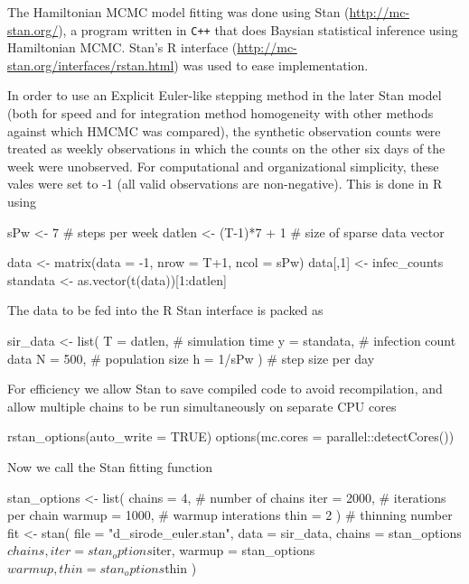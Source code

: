 \documentclass[12pt]{article}
\begin{document}
    The Hamiltonian MCMC model fitting was done using Stan (\url{http://mc-stan.org/}), a program written in \verb|C++| that does Baysian statistical inference using Hamiltonian MCMC. Stan's R interface (\url{http://mc-stan.org/interfaces/rstan.html}) was used to ease implementation.

    In order to use an Explicit Euler-like stepping method in the later Stan model (both for speed and for integration method homogeneity with other methods against which HMCMC was compared), the synthetic observation counts were treated as weekly observations in which the counts on the other six days of the week were unobserved. For computational and organizational simplicity, these vales were set to -1 (all valid observations are non-negative). This is done in R using

    \begin{R}
    sPw <- 7               # steps per week
    datlen <- (T-1)*7 + 1  # size of sparse data vector

    data <- matrix(data = -1, nrow = T+1, ncol = sPw)
    data[,1] <- infec_counts
    standata <- as.vector(t(data))[1:datlen]
    \end{R}

    The data to be fed into the R Stan interface is packed as

    \begin{R}
    sir_data <- list( T = datlen,    # simulation time
                     y = standata,  # infection count data
                     N = 500,       # population size
                     h = 1/sPw )    # step size per day 
    \end{R}

    For efficiency we allow Stan to save compiled code to avoid recompilation, and allow multiple chains to be run simultaneously on separate CPU cores

    \begin{R}
    rstan_options(auto_write = TRUE)
    options(mc.cores = parallel::detectCores())
    \end{R}

    Now we call the Stan fitting function

    \begin{R}
	stan_options <- list(	  chains = 4,    # number of chains
                        	iter   = 2000, # iterations per chain
                        	warmup = 1000, # warmup interations
                        	thin   = 2 )   # thinning number
	fit <- stan( file    = "d_sirode_euler.stan",
            	data    = sir_data,
            	chains  = stan_options$chains,
            	iter    = stan_options$iter,
            	warmup  = stan_options$warmup,
            	thin    = stan_options$thin )
    \end{R}
\end{document}
